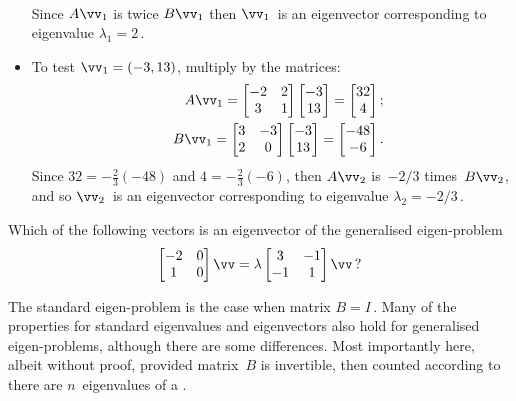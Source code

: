 \begin{example}
\begin{solution}
\begin{itemize}
\begin{eqnarray*}
\end{eqnarray*}
Since \(A\vv_1\) is twice \(B\vv_1\) then \(\vv_1\)~is an eigenvector corresponding to eigenvalue \(\lambda_1=2\)\,.
\item To test \(\vv_1=(-3,13)\), multiply by the matrices:
\begin{eqnarray*}
&&A\vv_1=\begin{bmatrix} -2&2\\3&1 \end{bmatrix}\begin{bmatrix} -3\\13 \end{bmatrix}
=\begin{bmatrix} 32\\4 \end{bmatrix};
\\&&B\vv_1=\begin{bmatrix} 3&-3\\2&0 \end{bmatrix}\begin{bmatrix} -3\\13 \end{bmatrix}
=\begin{bmatrix} -48\\-6 \end{bmatrix}.
\end{eqnarray*}
Since \(32=-\tfrac23(-48)\) and \(4=-\tfrac23(-6)\), then \(A\vv_2\) is~\(-2/3\) times~\(B\vv_2\), and so \(\vv_2\)~is an eigenvector corresponding to eigenvalue \(\lambda_2=-2/3\)\,.
\end{itemize}
\end{solution}
\end{example}


\begin{activity}
Which of the following vectors is an eigenvector of the generalised eigen-problem
\begin{equation*}
\begin{bmatrix} -2&0\\1&0 \end{bmatrix}\vv=\lambda\begin{bmatrix} 3&-1\\-1&1 \end{bmatrix}\vv\,?
\end{equation*}
\end{activity}


The standard eigen-problem is the case when matrix \(B=I\)\,.
Many of the properties for standard eigenvalues and eigenvectors also hold for generalised eigen-problems, although there are some differences.
Most importantly here, albeit without proof, provided matrix~\(B\) is invertible, then counted according to  there are \(n\)~eigenvalues of a .

